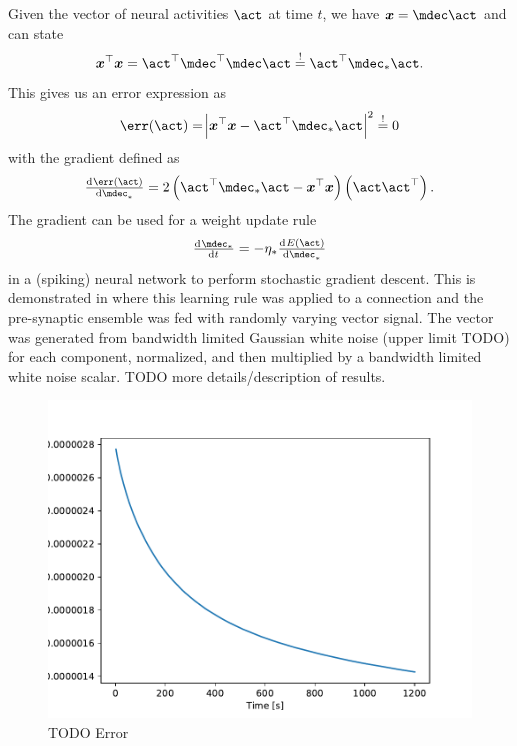 Given the vector of neural activities $\vc \act$ at time $t$, we have $\vc x = \mdec \vc \act$ and can state
\begin{equation}
    \vc x\Tr \vc x = \vc \act\Tr \mdec\Tr \mdec \vc\act \overset{!}{=} \vc\act\Tr\mdec_*\vc\act \text{.}
\end{equation}
This gives us an error expression as
\begin{equation}
    \err(\vc\act) = \abs{\vc x\Tr \vc x - \vc\act\Tr \mdec_* \vc\act}^2 \overset{!}{=} 0
\end{equation}
with the gradient defined as
\begin{equation}
    \od{\err(\vc\act)}{\mdec_*} = 2 \del{\vc\act\Tr \mdec_* \vc\act - \vc x\Tr \vc x} \del{\vc\act \vc\act\Tr} \text{.}
\end{equation}
The gradient can be used for a weight update rule
\begin{equation}
    \od{\mdec_*}{t} = -\eta_* \od{E(\vc\act)}{\mdec_*}
\end{equation}
in a (spiking) neural network to perform stochastic gradient descent.
This is demonstrated in  where this learning rule was applied to a connection and the pre-synaptic ensemble was fed with randomly varying vector signal.
The vector was generated from bandwidth limited Gaussian white noise (upper limit TODO) for each component, normalized, and then multiplied by a bandwidth limited white noise scalar.
TODO more details/description of results.
\begin{figure}
    \centering
    \includegraphics[scale=0.5]{figures/aml-grad-err}
    \caption{TODO Error}\label{aml:grad-err}
\end{figure}
